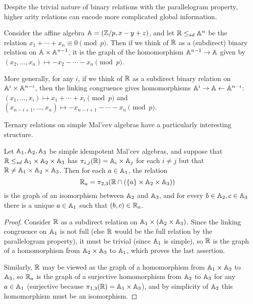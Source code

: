 \documentclass[letterpaper,11pt]{article}
\begin{document}
Despite the trivial nature of binary relations with the parallelogram property, higher arity relations can encode more complicated global information.

\begin{ex} Consider the affine algebra $\mathbb{A} = (\mathbb{Z}/p, x-y+z)$, and let $\mathbb{R} \le_{sd} \mathbb{A}^n$ be the relation $x_1 + \cdots + x_n \equiv 0\pmod{p}$. Then if we think of $\mathbb{R}$ as a (subdirect) binary relation on $\mathbb{A}\times \mathbb{A}^{n-1}$, it is the graph of the homomorphism $\mathbb{A}^{n-1} \rightarrow \mathbb{A}$ given by $(x_2, ..., x_n) \mapsto -x_2-\cdots -x_n\pmod{p}$.

More generally, for any $i$, if we think of $\mathbb{R}$ as a subdirect binary relation on $\mathbb{A}^i\times \mathbb{A}^{n-i}$, then the linking congruence gives homomorphisms $\mathbb{A}^i \rightarrow \mathbb{A} \leftarrow \mathbb{A}^{n-i}$: $(x_1, ..., x_i)\mapsto x_1 + \cdots + x_i\pmod{p}$ and $(x_{n-i+1}, ..., x_n) \mapsto -x_{n-i+1}-\cdots - x_n\pmod{p}$.
\end{ex}

Ternary relations on simple Mal'cev algebras have a particularly interesting structure.

\begin{prop} Let $\mathbb{A}_1, \mathbb{A}_2, \mathbb{A}_3$ be simple idempotent Mal'cev algebras, and suppose that $\mathbb{R}\le_{sd} \mathbb{A}_1\times\mathbb{A}_2\times\mathbb{A}_3$ has $\pi_{i,j}(\mathbb{R}) = \mathbb{A}_i\times\mathbb{A}_j$ for each $i\ne j$ but that $\mathbb{R} \ne \mathbb{A}_1\times\mathbb{A}_2\times\mathbb{A}_3$. Then for each $a \in \mathbb{A}_1$, the relation
\[
\mathbb{R}_a = \pi_{2,3}(\mathbb{R} \cap (\{a\}\times \mathbb{A}_2\times \mathbb{A}_3))
\]
is the graph of an isomorphism between $\mathbb{A}_2$ and $\mathbb{A}_3$, and for every $b \in \mathbb{A}_2, c \in \mathbb{A}_3$ there is a unique $a \in \mathbb{A}_1$ such that $(b,c) \in \mathbb{R}_a$.
\end{prop}
\begin{proof} Consider $\mathbb{R}$ as a subdirect relation on $\mathbb{A}_1\times (\mathbb{A}_2\times \mathbb{A}_3)$. Since the linking congruence on $\mathbb{A}_1$ is not full (else $\mathbb{R}$ would be the full relation by the parallelogram property), it must be trivial (since $\mathbb{A}_1$ is simple), so $\mathbb{R}$ is the graph of a homomorphism from $\mathbb{A}_2\times \mathbb{A}_3$ to $\mathbb{A}_1$, which proves the last assertion.

Similarly, $\mathbb{R}$ may be viewed as the graph of a homomorphism from $\mathbb{A}_1\times \mathbb{A}_2$ to $\mathbb{A}_3$, so $\mathbb{R}_a$ is the graph of a surjective homomorphism from $\mathbb{A}_2$ to $\mathbb{A}_3$ for any $a \in \mathbb{A}_1$ (surjective because $\pi_{1,3}(\mathbb{R}) = \mathbb{A}_1 \times \mathbb{A}_3$), and by simplicity of $\mathbb{A}_2$ this homomorphism must be an isomorphism.
\end{proof}
\end{document}
